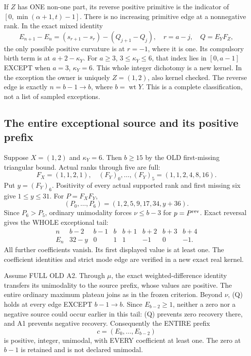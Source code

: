 If $Z$ has ONE non-one part, its reverse positive primitive is
the indicator of $[0,\min(\alpha+1,t)-1]$. There is no increasing
primitive edge at a nonnegative rank. In the exact mixed identity
\[
 E_{n+1}-E_n=(s_{r+1}-s_r)-(Q_{j+1}-Q_j),\quad
 r=a-j,\quad Q=E_YF_Z,
\]
the only possible positive curvature is at $r=-1$, where it is one.
Its compulsory birth term is at $a+2-\kappa_Y$.
For $a\ge3$, $3\le\kappa_Y\le6$, that index lies in $[0,a-1]$
EXCEPT when $a=3$, $\kappa_Y=6$. This whole integer dichotomy
is a new kernel. In the exception the owner is uniquely
$Z=(1,2)$, also kernel checked. The reverse edge is exactly
$n=b-1\longrightarrow b$, where $b=\operatorname{wt}Y$.
This is a complete classification, not a list of sampled exceptions.

\subsection{The entire exceptional source and its positive prefix}
Suppose $X=(1,2)$ and $\kappa_Y=6$. Then $b\ge15$ by the OLD
first-missing triangular bound. Actual ranks through five are full:
\[
 F_X=(1,1,2,1),\quad (F_Y)_0,\ldots,(F_Y)_5=(1,1,2,4,8,16).
\]
Put $y=(F_Y)_6$. Positivity of every actual supported rank and
first missing six give $1\le y\le31$. For $P=F_XF_Y$,
\[
       (P_0,\ldots,P_6)=(1,2,5,9,17,34,y+36).
\]
Since $P_6>P_5$, ordinary unimodality forces
$\nu\le b-3$ for $p=P^{\rm rev}$.
Exact reversal gives the WHOLE exceptional tail:
\[
\begin{array}{c|rrrrrrr}
 n&b-2&b-1&b&b+1&b+2&b+3&b+4\\\hline
 E_n&32-y&0&1&1&-1&0&-1.
\end{array}                                                     \tag{1}
\]
All further coefficients vanish. Its first displayed value is
at least one. The coefficient identities and strict mode edge
are verified in a new exact real kernel.

Assume FULL OLD A2. Through $\mu$, the exact weighted-difference
identity transfers its unimodality to the source prefix, whose
values are positive. The entire ordinary maximum plateau joins
as in the frozen criterion. Beyond $\nu$, (Q) holds at every edge
EXCEPT $b-1\to b$. Since $E_{b-2}\ge1$, neither a zero nor a
negative source could occur earlier in this tail: (Q) prevents
zero recovery there, and A1 prevents negative recovery.
Consequently the ENTIRE prefix
\[
                    c=(E_0,\ldots,E_{b-2})
\]
is positive, integer, unimodal, with EVERY coefficient at least one.
The zero at $b-1$ is retained and is not declared unimodal.

